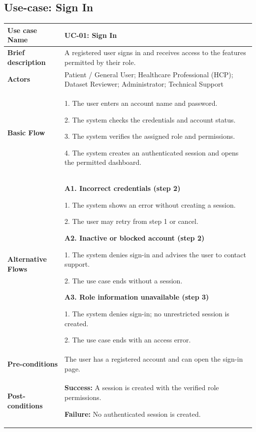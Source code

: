 
\clearpage
\subsection{Use-case: Sign In}
\label{uc:uc-01}
\begin{longtable}{|p{}|p{}|}
\hline
\textbf{Use case Name} & UC-01: Sign In \\ \hline
\textbf{Brief description} & A registered user signs in and receives access to the features permitted by their role. \\ \hline
\textbf{Actors} & Patient / General User; Healthcare Professional (HCP); Dataset Reviewer; Administrator; Technical Support \\ \hline
\textbf{Basic Flow} &
1. The user enters an account name and password.\par
2. The system checks the credentials and account status.\par
3. The system verifies the assigned role and permissions.\par
4. The system creates an authenticated session and opens the permitted dashboard.
\\ \hline
\textbf{Alternative Flows} &
\textbf{A1. Incorrect credentials (step 2)}\par
1. The system shows an error without creating a session.\par
2. The user may retry from step 1 or cancel.
\par\smallskip
\textbf{A2. Inactive or blocked account (step 2)}\par
1. The system denies sign-in and advises the user to contact support.\par
2. The use case ends without a session.
\par\smallskip
\textbf{A3. Role information unavailable (step 3)}\par
1. The system denies sign-in; no unrestricted session is created.\par
2. The use case ends with an access error.
\\ \hline
\textbf{Pre-conditions} & The user has a registered account and can open the sign-in page. \\ \hline
\textbf{Post-conditions} & \textbf{Success:} A session is created with the verified role permissions.\par
\textbf{Failure:} No authenticated session is created. \\ \hline
\end{longtable}

